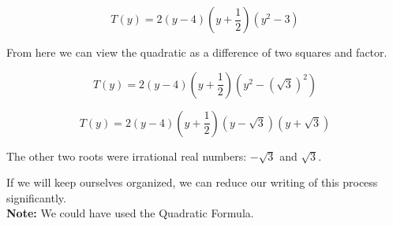 \documentclass{ximera}
\begin{document}
\begin{explanation}
\[
T(y) = 2 (y-4) \left(y+\frac{1}{2}\right) (y^2  - 3)
\]


From here we can view the quadratic as a difference of two squares and factor. 



\[
T(y) = 2 (y-4) \left(y+\frac{1}{2}\right) (y^2 - (\sqrt{3})^2)
\]



\[
T(y) = 2 (y-4) \left(y+\frac{1}{2}\right) (y - \sqrt{3}) (y + \sqrt{3})
\]


The other two roots were irrational real numbers: $-\sqrt{3}$ and $\sqrt{3}$.


\end{explanation}

If we will keep ourselves organized, we can reduce our writing of this process significantly. \\

\textbf{Note:} We could have used the Quadratic Formula.
\end{document}
